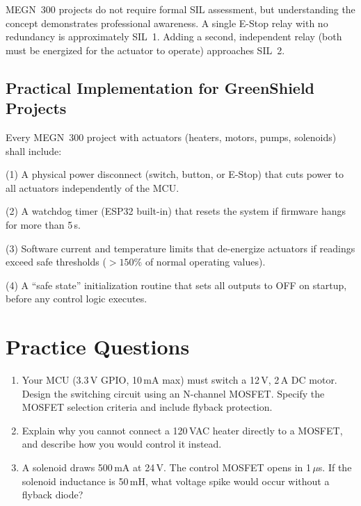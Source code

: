 \documentclass[11pt,letterpaper,twoside,openany]{book}
\begin{document}
MEGN~300 projects do not require formal SIL assessment, but understanding the concept demonstrates professional awareness. A single E-Stop relay with no redundancy is approximately SIL~1. Adding a second, independent relay (both must be energized for the actuator to operate) approaches SIL~2.

\subsection{Practical Implementation for GreenShield Projects}
Every MEGN~300 project with actuators (heaters, motors, pumps, solenoids) shall include:

(1) A physical power disconnect (switch, button, or E-Stop) that cuts power to all actuators independently of the MCU.

(2) A watchdog timer (ESP32 built-in) that resets the system if firmware hangs for more than 5\,s.

(3) Software current and temperature limits that de-energize actuators if readings exceed safe thresholds ($> 150\%$ of normal operating values).

(4) A ``safe state'' initialization routine that sets all outputs to OFF on startup, before any control logic executes.
\section{Practice Questions}
\begin{enumerate}[leftmargin=1.5em]
\item Your MCU (3.3\,V GPIO, 10\,mA max) must switch a 12\,V, 2\,A DC motor. Design the switching circuit using an N-channel MOSFET. Specify the MOSFET selection criteria and include flyback protection.
\item Explain why you cannot connect a 120\,VAC heater directly to a MOSFET, and describe how you would control it instead.
\item A solenoid draws 500\,mA at 24\,V. The control MOSFET opens in 1\,$\mu$s. If the solenoid inductance is 50\,mH, what voltage spike would occur without a flyback diode?
\end{enumerate}
\end{document}
